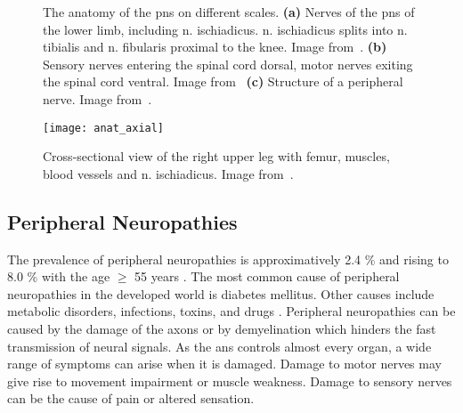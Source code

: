 \begin{figure}[htbp]
    \begin{minipage}[c][0.9\textheight][t]{.5\textwidth}
        \centering
        \vspace*{\fill}
    \end{minipage}
    \begin{minipage}[c][0.9\textheight][t]{.5\textwidth}
        \centering
        \vspace*{\fill}
        \vfill
    \end{minipage}
    \vspace*{-0.3cm}
    \caption[Anatomy of the Peripheral Nervous System]{The anatomy of the \gls{pns} on different scales. \textbf{(a)} Nerves of the \gls{pns} of the lower limb, including \gls{n.} ischiadicus. \gls{n.} ischiadicus splits into \gls{n.} tibialis and \gls{n.} fibularis proximal to the knee. Image from~\cite{Schunke2014PrometheusAnatomie}. \textbf{(b)} Sensory nerves entering the spinal cord dorsal, motor nerves exiting the spinal cord ventral. Image from~\cite{Schunke2015THIEMEAnatomy} \textbf{(c)} Structure of a peripheral nerve. Image from~\cite{Schunke2015THIEMEAnatomy}.}
    \label{fig:anat}
\end{figure}

\begin{figure}[htbp]
	\texttt{[image: anat\_axial]}
    \caption[Cross-section of the Right Upper Leg]{Cross-sectional view of the right upper leg with femur, muscles, blood vessels and \gls{n.} ischiadicus. Image from~\cite{Schunke2014PrometheusAnatomie}.}
    \label{fig:anat_axial}
\end{figure}

\subsection{Peripheral Neuropathies}
The prevalence of peripheral neuropathies is approximatively 2.4 \% and rising to 8.0 \% with the age $\geq$ 55 years \cite{Martyn1997EpidemiologyNeuropathy}. The most common cause of peripheral neuropathies in the developed world is diabetes mellitus. Other causes include metabolic disorders, infections, toxins, and drugs \cite{England2004PeripheralNeuropathy,Hughes466}.
Peripheral neuropathies can be caused by the damage of the axons or by demyelination which hinders the fast transmission of neural signals. 
As the \gls{ans} controls almost every organ, a wide range of symptoms can arise when it is damaged. Damage to motor nerves may give rise to movement impairment or muscle weakness. Damage to sensory nerves can be the cause of pain or altered sensation.

